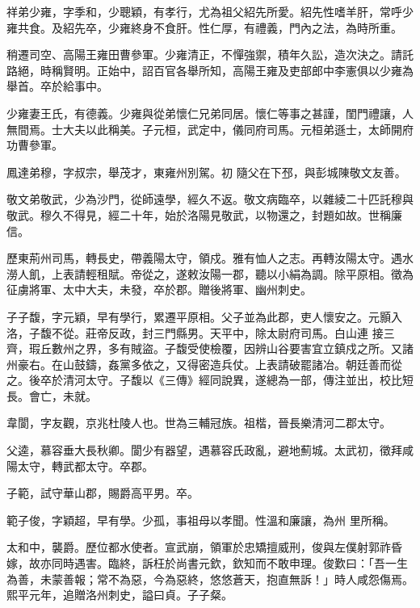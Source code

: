 \begin{pinyinscope}
 祥弟少雍，字季和，少聰穎，有孝行，尤為祖父紹先所愛。紹先性嗜羊肝，常呼少雍共食。及紹先卒，少雍終身不食肝。性仁厚，有禮義，門內之法，為時所重。



 稍遷司空、高陽王雍田曹參軍。少雍清正，不憚強禦，積年久訟，造次決之。請託路絕，時稱賢明。正始中，詔百官各舉所知，高陽王雍及吏部郎中李憲俱以少雍為舉首。卒於給事中。



 少雍妻王氏，有德義。少雍與從弟懷仁兄弟同居。懷仁等事之甚謹，閨門禮讓，人無間焉。士大夫以此稱美。子元桓，武定中，儀同府司馬。元桓弟遜士，太師開府功曹參軍。



 鳳達弟穆，字叔宗，舉茂才，東雍州別駕。初
 隨父在下邳，與彭城陳敬文友善。



 敬文弟敬武，少為沙門，從師遠學，經久不返。敬文病臨卒，以雜綾二十匹託穆與敬武。穆久不得見，經二十年，始於洛陽見敬武，以物還之，封題如故。世稱廉信。



 歷東荊州司馬，轉長史，帶義陽太守，領戍。雅有恤人之志。再轉汝陽太守。遇水澇人飢，上表請輕租賦。帝從之，遂敕汝陽一郡，聽以小絹為調。除平原相。徵為征虜將軍、太中大夫，未發，卒於郡。贈後將軍、幽州刺史。



 子子馥，字元穎，早有學行，累遷平原相。父子並為此郡，吏人懷安之。元顥入洛，子馥不從。莊帝反政，封三門縣男。天平中，除太尉府司馬。白山連
 接三齊，瑕丘數州之界，多有賊盜。子馥受使檢覆，因辨山谷要害宜立鎮戍之所。又諸州豪右。在山鼓鑄，姦黨多依之，又得密造兵仗。上表請破罷諸冶。朝廷善而從之。後卒於清河太守。子馥以《三傳》經同說異，遂總為一部，傳注並出，校比短長。會亡，未就。



 韋閬，字友觀，京兆杜陵人也。世為三輔冠族。祖楷，晉長樂清河二郡太守。



 父逵，慕容垂大長秋卿。閬少有器望，遇慕容氏政亂，避地薊城。太武初，徵拜咸陽太守，轉武都太守。卒郡。



 子範，試守華山郡，賜爵高平男。卒。



 範子俊，字穎超，早有學。少孤，事祖母以孝聞。性溫和廉讓，為州
 里所稱。



 太和中，襲爵。歷位都水使者。宣武崩，領軍於忠矯擅威刑，俊與左僕射郭祚昏嫁，故亦同時遇害。臨終，訴枉於尚書元欽，欽知而不敢申理。俊歎曰：「吾一生為善，未蒙善報；常不為惡，今為惡終，悠悠蒼天，抱直無訴！」時人咸怨傷焉。熙平元年，追贈洛州刺史，謚曰貞。子子粲。




\end{pinyinscope}
